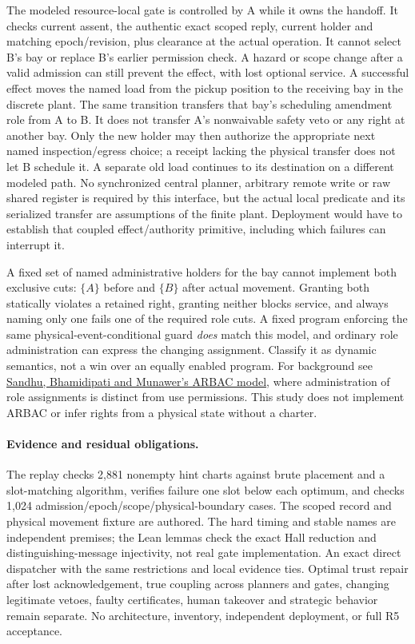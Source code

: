 \documentclass{article}
\begin{document}
The modeled resource-local gate is controlled by A while it owns
the handoff. It checks current assent, the authentic exact scoped
reply, current holder and matching epoch/revision, plus clearance at
the actual operation. It cannot select B's bay or replace B's earlier
permission check. A hazard or scope change after a valid admission
can still prevent the effect, with lost optional service. A successful
effect moves the named load from the pickup position to the receiving
bay in the discrete plant. The same transition transfers
that bay's scheduling amendment role from A to B. It does not
transfer A's nonwaivable safety veto or any right at another bay.
Only the new holder may then authorize the appropriate next named
inspection/egress choice; a receipt lacking the physical transfer
does not let B schedule it. A separate old load continues to
its destination on a different modeled path. No synchronized
central planner, arbitrary remote write or raw shared register is
required by this interface, but the actual local predicate and its
serialized transfer are assumptions of the finite plant. Deployment
would have to establish that coupled effect/authority primitive,
including which failures can interrupt it.

A fixed set of named administrative holders for the bay cannot
implement both exclusive cuts: \(\{A\}\) before and \(\{B\}\) after
actual movement. Granting both statically violates a retained right,
granting neither blocks service, and always naming only one fails
one of the required role cuts. A fixed program enforcing the same
physical-event-conditional guard \emph{does} match this model, and
ordinary role administration can express the changing assignment.
Classify it as dynamic semantics, not a win over an equally enabled
program. For background see
\href{https://doi.org/10.1145/300830.300839}{Sandhu, Bhamidipati and
Munawer's ARBAC model}, where administration of role assignments is
distinct from use permissions. This study does not implement ARBAC
or infer rights from a physical state without a charter.

\paragraph{Evidence and residual obligations.}
The replay checks 2,881 nonempty hint charts against brute placement
and a slot-matching algorithm, verifies failure one slot below each
optimum, and checks 1,024 admission/epoch/scope/physical-boundary
cases. The scoped record and physical movement fixture are authored.
The hard timing and stable names are independent premises; the Lean
lemmas check the exact Hall reduction and distinguishing-message
injectivity, not real gate implementation. An exact direct dispatcher
with the same restrictions and local evidence ties. Optimal trust
repair after lost acknowledgement, true coupling across planners and
gates, changing legitimate vetoes, faulty certificates, human
takeover and strategic behavior remain separate. No architecture,
inventory, independent deployment, or full R5 acceptance.
\end{document}
